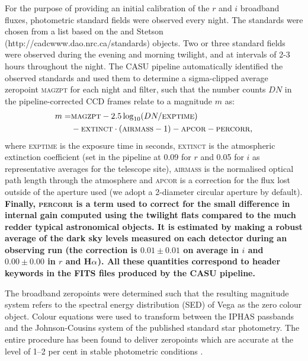 \documentclass[a4paper,useAMS,usenatbib]{mn2e}
\def\ha{\mbox{H$\rm \alpha$}}
\begin{document}
For the purpose of providing an initial calibration 
of the $r$ and $i$ broadband fluxes,
photometric standard fields were observed every night.
The standards were chosen from a list based on 
the \cite{Landolt1992} and Stetson (http://cadcwww.dao.nrc.ca/standards) 
objects.
Two or three standard fields were observed 
during the evening and morning twilight,
and at intervals of 2-3 hours throughout the night.
The CASU pipeline automatically identified the observed standards 
and used them to determine a sigma-clipped average zeropoint \textsc{magzpt}
for each night and filter,
such that the number counts $DN$ 
in the pipeline-corrected CCD frames
relate to a magnitude $m$ as:
\begin{equation}
\begin{split}
   m  = & \textsc{magzpt} - 2.5 \log_{10}( DN / \textsc{exptime} ) \\
 &  - \textsc{extinct}\cdot(\textsc{airmass}-1) - \textsc{apcor} - \textsc{percorr},
\label{eqn:mag}
\end{split}
\end{equation}
where \textsc{exptime} is the exposure time in seconds,
\textsc{extinct} is the atmospheric extinction coefficient 
(set in the pipeline at 0.09 for $r$ and 0.05 for $i$ as representative
averages for the telescope site),
\textsc{airmass} is the normalised optical path length 
through the atmosphere and
\textsc{apcor} is a correction for the flux
lost outside of the aperture used
(we adopt a 2-diameter circular aperture by default).
{\bf
Finally, \textsc{percorr} is a term used to correct 
for the small difference in internal gain
computed using the twilight flats
compared to the much redder typical astronomical objects. 
It is estimated by making a robust average of the dark sky levels 
measured on each detector during an observing run
(the correction is $0.01\pm0.01$ on average in $i$ and
$0.00\pm0.00$ in $r$ and \ha).
All these quantities correspond to header keywords
in the FITS files produced by the CASU pipeline. }

The broadband zeropoints were determined such that the resulting magnitude system
refers to the spectral energy distribution (SED) of Vega 
as the zero colour object. 
Colour equations were used to transform between the IPHAS passbands 
and the Johnson-Cousins system 
of the published standard star photometry.
The entire procedure has been found to deliver zeropoints which 
are accurate at the level of 1--2 per cent 
in stable photometric conditions \citep{Gonzalez-Solares2011}.
\end{document}
